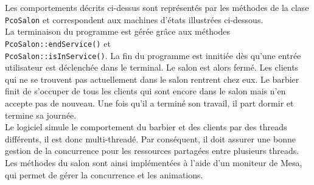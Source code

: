 \documentclass{article}
\begin{document}
Les comportements décrits ci-dessus sont représentés par les méthodes de la clase \texttt{PcoSalon} et correspondent aux machines d'états
illustrées ci-dessous. \\

La terminaison du programme est gérée grâce aux méthodes \texttt{PcoSalon::endService()} et \\ \texttt{PcoSalon::isInService()}.
La fin du programme
est innitiée dès qu'une entrée utilisateur est déclenchée dans le terminal. Le salon est alors fermé. Les clients qui ne se trouvent pas
actuellement dans le salon rentrent chez eux. Le barbier finit de s'occuper de tous les clients qui sont encore dans le salon mais n'en
accepte pas de nouveau. Une fois qu'il a terminé son travail, il part dormir et termine sa journée. \\

Le logiciel simule le comportement du barbier et des clients par des threads différents, il est donc multi-threadé. Par conséquent, il doit 
assurer une bonne gestion de la concurrence pour les ressources partagées entre plusieurs threads. Les méthodes du salon sont ainsi implémentées 
à l'aide d'un moniteur de Mesa, qui permet de gérer la concurrence et les animations. 
\end{document}
